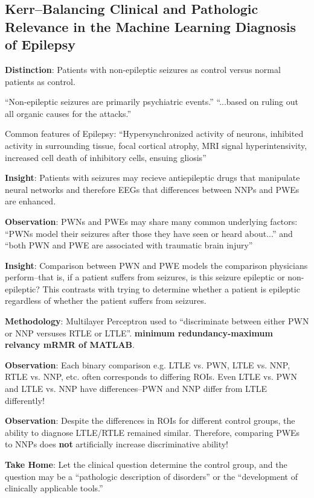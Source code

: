 \documentclass{article}
\begin{document}
    \subsection{Kerr--Balancing Clinical and Pathologic Relevance in the Machine 
Learning
    Diagnosis of Epilepsy}
        \textbf{Distinction}: Patients with non-epileptic seizures as control 
versus
        normal patients as control.

        ``Non-epileptic seizures are primarily psychiatric events.'' ``...based 
on
        ruling out all organic causes for the attacks.''


        Common features of Epilepsy: ``Hypersynchronized activity of neurons, 
inhibited
        activity in surrounding tissue, focal cortical atrophy, MRI signal
        hyperintensivity, increased cell death of inhibitory cells, ensuing 
gliosis''

        \textbf{Insight}: Patients with seizures may recieve antiepileptic drugs 
that manipulate
        neural networks and therefore EEGs that differences between NNPs and 
PWEs are
        enhanced.

        \textbf{Observation}: PWNs and PWEs may share many common underlying 
factors: ``PWNs
        model their seizures after those they have seen or heard about...'' and 
``both
        PWN and PWE are associated with traumatic brain injury''

        \textbf{Insight}: Comparison between PWN and PWE models the comparison 
physicians
        perform--that is, if a patient suffers from seizures, is this seizure 
epileptic
        or non-epileptic? This contrasts with trying to determine whether a 
patient is
        epileptic regardless of whether the patient suffers from seizures.

        \textbf{Methodology}: Multilayer Perceptron used to ``discriminate 
between either PWN or
        NNP versuses RTLE or LTLE''. \textbf{minimum redundancy-maximum relvancy 
mRMR of
        MATLAB}.

        \textbf{Observation}: Each binary comparison e.g. LTLE vs. PWN, LTLE vs. 
NNP, RTLE vs.
        NNP, etc. often corresponds to differing ROIs. Even LTLE vs. PWN and 
LTLE vs.
        NNP have differences--PWN and NNP differ from LTLE differently!

        \textbf{Observation}: Despite the differences in ROIs for different 
control
        groups, the ability to diagnose LTLE/RTLE remained similar. Therefore,
        comparing PWEs to NNPs does \textbf{not} artificially increase 
discriminative
        ability!

        \textbf{Take Home}: Let the clinical question determine the control 
group, and
        the question may be a ``pathologic description of disorders'' or the
        ``development of clinically applicable tools.''  
\end{document}
